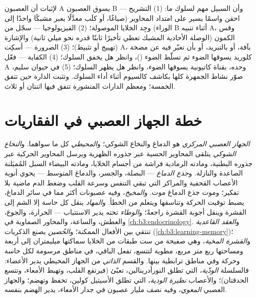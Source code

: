 \begin{method}\label{met:b3:nervous-systems:tracing}
لإثبات أن العصبون A يسوق العصبون B وأن السبيل مهم لسلوك ما:
(1) التشريح --- احقن واسمًا يسير على امتداد المحاوير
(صباغًا، أو  كلَب معدَّلًا يعبر مشبكًا واحدًا إلى
الوراء) وجِد الخلايا الموصولة؛ (2) الفيزيولوجيا --- سجّل من
B أثناء تنبيه A، وقس الكمون (الوصلة الأحادية المشبك تعطي
تأخيرًا ثابتًا قدره نحو ميلي ثانية) والإشارة (تهييج أو
تثبيط)؛ (3) الضرورة --- أسكِت A، بآفة، أو بالتبريد، أو بأن
تعبّر فيه عن مضخة كلوريد يسوقها الضوء ثم تسلّط الضوء
(\emph{})، وانظر هل يخفق السلوك؛ (4)
الكفاية --- فعّل A وحده، بقناة كاتيونية يسوقها الضوء، وانظر
هل يظهر السلوك؛ (5) في حيوان سليم، صوّر نشاط الجمهرة كلها
بكاشف كالسيوم أثناء أداء السلوك. وتثبت الدارة حين تتفق
الخمسة؛ ومعظم الدارات المنشورة تتفق فيها اثنتان أو ثلاث.
\end{method}

\section{خطة الجهاز العصبي في الفقاريات}

\begin{definition}\label{def:b3:nervous-systems:plan}
\emph{الجهاز العصبي المركزي} هو الدماغ والنخاع الشوكي؛
و\emph{المحيطي} كل ما سواهما. و\emph{النخاع الشوكي} يتلقى
المحاوير الحسية عبر جذوره الظهرية ويرسل المحاوير الحركية
عبر جذوره البطنية، ومادته الرمادية فراشة من أجسام الخلايا،
ومادته البيضاء السبل المُميَلنة الصاعدة والنازلة.
و\emph{جذع الدماغ} --- البصلة، والجسر، والدماغ المتوسط ---
يحوي أنوية الأعصاب القحفية والمراكز التي تبقي التنفس وسرعة
القلب وضغط الدم ماضية بلا تفكير؛ وموت جذع الدماغ موت.
و\emph{المخيخ}، وفيه عصبونات أكثر مما في سائر الدماغ، يضبط
توقيت الحركة وتناسقها ويتعلم من الخطأ. و\emph{المهاد} ينقل
كل حاسة إلا الشم إلى القشرة وينقل أجوبة القشرة راجعةً؛
و\emph{الوطاء} تحته يدير الاستتباب --- الحرارة، والجوع،
والعطش، والساعة، والمحاور الصماوية في
\cref{ch:b3:endocrinology}. و\emph{العقد القاعدية} تنتقي بين
الأفعال الممكنة؛ و\emph{الحُصين} يصنع الذكريات
(\cref{ch:b3:learning-memory})؛ و\emph{القشرة المخية}، وهي
صفيحة من ست طبقات من الخلايا سماكتها ميليمتران إلى أربعة
ومساحتها ربع متر مربع، مطوية لتتسع، تفعل الباقي، في مناطق
مرسومة لكل حاسة وحركة وفي مناطق ترابطية بينها. والقسم
\emph{الذاتي} من الجهاز المحيطي يدير الأعضاء: فالسلسلة
\emph{الودّية}، التي تطلق النورأدرينالين، تعبّئ (فيرتفع
القلب، وتهبط الأمعاء، وتتسع الحدقتان)؛ والأعصاب \emph{نظيرة
الودية}، التي تطلق الأسيتيل كولين، تحفظ وتهضم؛ والجهاز
العصبي \emph{المعوي}، وفيه نصف مليار عصبون في جدار الأمعاء،
يدير الهضم بنفسه.
\end{definition}

